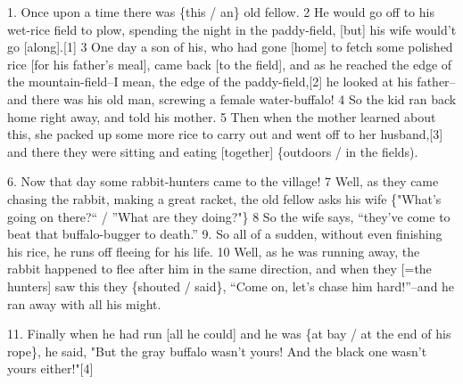\setcounter{footnote}{0}


1. Once upon a time there was \{this / an\} old fellow. 2 He would go off to his
wet-rice field to plow, spending the night in the paddy-field, [but] his wife would't
go [along].[1] 3 One day a son of his, who had gone [home] to fetch some polished
rice [for his father's meal], came back [to the field], and as he reached the edge
of the mountain-field--I mean, the edge of the paddy-field,[2] he looked at his
father--and there was his old man, screwing a female water-buffalo! 4 So the kid
ran back home right away, and told his mother. 5 Then when the mother learned about
this, she packed up some more rice to carry out and went off to her husband,[3]
and there they were sitting and eating [together] \{outdoors / in the fields).

6. Now that day some rabbit-hunters came to the village! 7 Well, as they came chasing
the rabbit, making a great racket, the old fellow asks his wife \{"What's
going on there?`` / ''What are they doing?"\} 8 So the
wife says, ``they've come to beat that buffalo-bugger to death.''
9. So all of a sudden, without even finishing his rice, he runs off fleeing for
his life. 10 Well, as he was running away, the rabbit happened to flee after him
in the same direction, and when they [=the hunters] saw this they \{shouted / said\},
``Come on, let's chase him hard!''--and he ran away with all his
might.

11. Finally when he had run [all he could] and he was \{at bay / at the end of his
rope\}, he said, "But the gray buffalo wasn't yours! And the black one
wasn't yours either!"[4]

